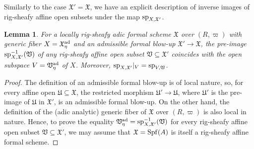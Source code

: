 \documentclass[12pt,twoside,a4paper]{article}
\newtheorem{lemma}[thm]{Lemma}
\theoremstyle{definition}
\theoremstyle{remark}
\newcommand\ad{{\rm ad}}
\newcommand\spc{{\rm sp}}
\newcommand\Spf{{\rm Spf}}
\begin{document}
Similarly to the case $\mathfrak{X}'=\mathfrak{X}$, we have an explicit description of inverse images of rig-sheafy affine open subsets under the map $\spc_{X,\mathfrak{X}'}$.
\begin{lemma}\label{Description of inverse images}For a locally rig-sheafy adic formal scheme $\mathfrak{X}$ over $(R, \varpi)$ with generic fiber $X=\mathfrak{X}_{\eta}^{\ad}$ and an admissible formal blow-up $\mathfrak{X}'\to \mathfrak{X}$, the pre-image $\spc_{X,\mathfrak{X}'}^{-1}(\mathfrak{V})$ of any rig-sheafy affine open subset $\mathfrak{V}\subseteq \mathfrak{X}'$ coincides with the open subspace $V=\mathfrak{V}_{\eta}^{\ad}$ of $X$. Moreover, $\spc_{X,\mathfrak{X}'}\vert_{V}=\spc_{V,\mathfrak{V}}$.\end{lemma}
\begin{proof}The definition of an admissible formal blow-up is of local nature, so, for every affine open $\mathfrak{U}\subseteq\mathfrak{X}$, the restricted morphism $\mathfrak{U}'\to \mathfrak{U}$, where $\mathfrak{U}'$ is the pre-image of $\mathfrak{U}$ in $\mathfrak{X}'$, is an admissible formal blow-up. On the other hand, the definition of the (adic analytic) generic fiber of $\mathfrak{X}$ over $(R, \varpi)$ is also local in nature. Hence, to prove the equality $\mathfrak{V}_{\eta}^{\ad}=\spc_{X,\mathfrak{X}'}^{-1}(\mathfrak{V})$ for every rig-sheafy affine open subset $\mathfrak{V}\subseteq\mathfrak{X}'$, we may assume that $\mathfrak{X}=\Spf(A)$ is itself a rig-sheafy affine formal scheme. 


\end{proof}
\end{document}
